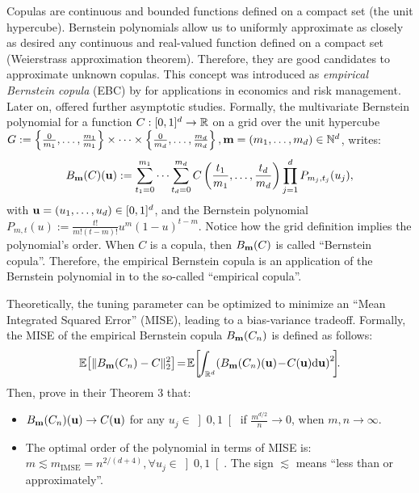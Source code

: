 Copulas are continuous and bounded functions defined on a compact set (the unit hypercube). 
Bernstein polynomials allow us to uniformly approximate as closely as desired any continuous and real-valued function defined on a compact set (Weierstrass approximation theorem). 
Therefore, they are good candidates to approximate unknown copulas. 
This concept was introduced as \emph{empirical Bernstein copula} (EBC) by \cite{sancetta_satchell_2004} for applications in economics and risk management. 
Later on, \cite{segers_2017} offered further asymptotic studies. 
Formally, the multivariate Bernstein polynomial for a function $C: [0, 1]^d \rightarrow \mathbb{R}$ on a grid over the unit hypercube $G:=\left\{\frac{0}{m_1}, \dots, \frac{m_1}{m_1}\right\} \times \dots \times \left\{\frac{0}{m_d}, \dots, \frac{m_d}{m_d}\right\}, {\bf m} = (m_1, \dots, m_d) \in \mathbb{N}^d$, writes: 
\begin{equation}
    B_{{\bf m}}(C)({\bf u}) := \sum_{t_1=0}^{m_1} \dots \sum_{t_d=0}^{m_d} C\left(\frac{t_1}{m_1}, \dots, \frac{t_d}{m_d}\right) \prod_{j=1}^d P_{m_j, t_j}(u_j),\label{eq:ebc}
\end{equation}
with ${\bf u} = (u_1, \dots, u_d) \in [0, 1]^d$, and the Bernstein polynomial $P_{m, t}(u):= \frac{t!}{m!(t-m)!}u^m(1-u)^{t-m}$. 
Notice how the grid definition implies the polynomial's order. 
When $C$ is a copula, then $B_{{\bf m}}(C)$ is called ``Bernstein copula''. 
Therefore, the empirical Bernstein copula is an application of the Bernstein polynomial in  to the so-called ``empirical copula''.

Theoretically, the tuning parameter can be optimized to minimize an ``Mean Integrated Squared Error'' (MISE), leading to a bias-variance tradeoff. 
Formally, the MISE of the empirical Bernstein copula $B_{{\bf m}}(C_n)$ is defined as follows:
\begin{equation}
    \E\!\left[ \lVert B_{\bm}(C_n) - C \rVert^2_2 \right] \!=\! \E\!\left[\!\int_{\R^d}\! \left(B_{\bm}(C_n)(\bu) \!-\! C(\bu) \d \bu \right)^2 \!\right]\!\!.
    \label{eq:kimse}
\end{equation}
Then, \cite{sancetta_satchell_2004} prove in their Theorem 3 that: 
\begin{itemize}
    \item $B_{{\bf m}}(C_n)({\bf u}) \rightarrow C({\bf u})$ for any $u_j \in \left]0, 1\right[$ if $\frac{m^{d/2}}{n} \rightarrow 0$, when $m, n \rightarrow \infty$.
    \item The optimal order of the polynomial in terms of MISE is: $m \lesssim m_{\mathrm{IMSE}} = n^{2/(d+4)}, \forall u_j \in \left]0, 1\right[$. The sign $\lesssim$ means ``less than or approximately''.
\end{itemize}

